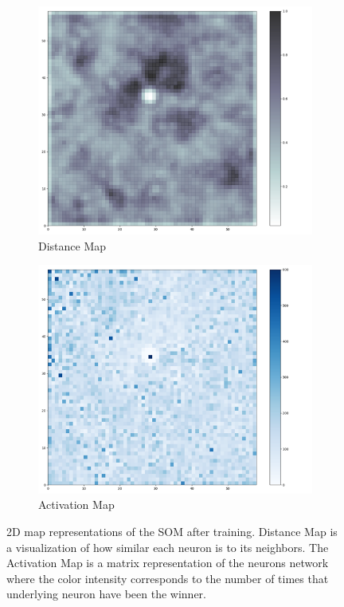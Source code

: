\begin{figure}
     \centering
     \begin{subfigure}[b]{0.45\textwidth}
         \centering
         \includegraphics[width=\textwidth]{figures/SOM_distance.png}
         \caption{Distance Map}
         \label{fig:distanceMap}
     \end{subfigure}
     \hfill
     \begin{subfigure}[b]{0.45\textwidth}
         \centering
         \includegraphics[width=\textwidth]{figures/SOM_activation.png}
         \caption{Activation Map}
         \label{fig:activationMap}
     \end{subfigure}
        \caption{2D map representations of the SOM after training. Distance Map is a visualization of how similar each neuron is to its neighbors. The Activation Map is a matrix representation of the neurons network where the color intensity corresponds to the number of times that underlying neuron have been the winner.}

\end{figure}

